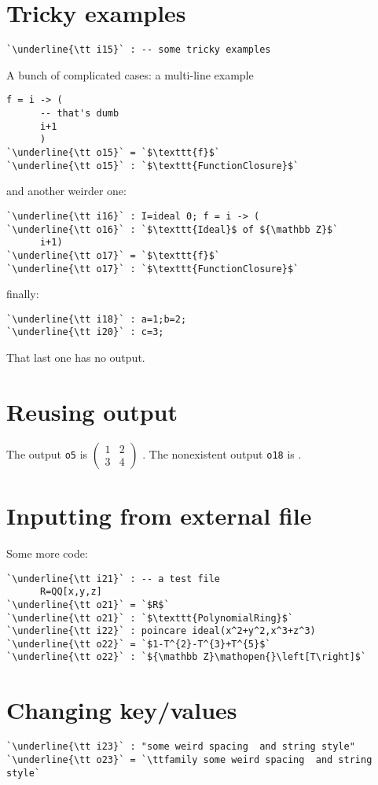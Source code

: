 \documentclass[12pt,a4paper]{amsart}
\begin{document}
\section{Tricky examples}
\begin{lstlisting}[language=Macaulay2output]
`\underline{\tt i15}` : -- some tricky examples
\end{lstlisting}
A bunch of complicated cases: a multi-line example
\begin{lstlisting}[language=Macaulay2output]
      f = i -> (
      -- that's dumb
      i+1
      )
`\underline{\tt o15}` = `$\texttt{f}$`
`\underline{\tt o15}` : `$\texttt{FunctionClosure}$`
\end{lstlisting}
and another weirder one:
\begin{lstlisting}[language=Macaulay2output]
`\underline{\tt i16}` : I=ideal 0; f = i -> (
`\underline{\tt o16}` : `$\texttt{Ideal}$ of ${\mathbb Z}$`
      i+1)
`\underline{\tt o17}` = `$\texttt{f}$`
`\underline{\tt o17}` : `$\texttt{FunctionClosure}$`
\end{lstlisting}
finally:
\begin{lstlisting}[language=Macaulay2output]
`\underline{\tt i18}` : a=1;b=2;
`\underline{\tt i20}` : c=3;
\end{lstlisting}
That last one has no output.

\section{Reusing output}
The output {\tt o5} is $\left(\begin{smallmatrix}
1&2\\
3&4
\end{smallmatrix}\right)$%
.
The nonexistent output {\tt o18} is %
.

\section{Inputting from external file}
Some more code:
\begin{lstlisting}[language=Macaulay2output]
`\underline{\tt i21}` : -- a test file
      R=QQ[x,y,z]
`\underline{\tt o21}` = `$R$`
`\underline{\tt o21}` : `$\texttt{PolynomialRing}$`
`\underline{\tt i22}` : poincare ideal(x^2+y^2,x^3+z^3)
`\underline{\tt o22}` = `$1-T^{2}-T^{3}+T^{5}$`
`\underline{\tt o22}` : `${\mathbb Z}\mathopen{}\left[T\right]$`
\end{lstlisting}

\section{Changing key/values}
\begin{lstlisting}[showstringspaces=true,language=Macaulay2output,basewidth={1.5ex}]
`\underline{\tt i23}` : "some weird spacing  and string style"
`\underline{\tt o23}` = `\ttfamily some weird spacing  and string style`
\end{lstlisting}
\end{document}
